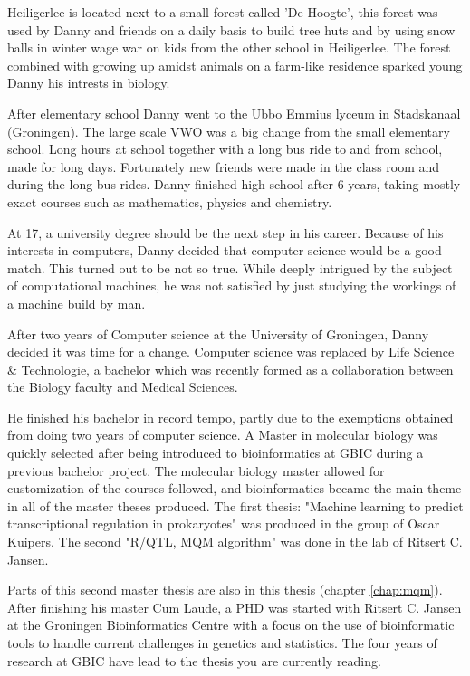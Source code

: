 Heiligerlee is located next to a small forest called 'De Hoogte', this forest was used 
by Danny and friends on a daily basis to build tree huts and by using snow balls in winter 
wage war on kids from the other school in Heiligerlee. The forest combined with growing up 
amidst animals on a farm-like residence sparked young Danny his intrests in biology.

After elementary school Danny went to the Ubbo Emmius lyceum in Stadskanaal (Groningen). 
The large scale VWO was a big change from the small elementary school. Long hours at school 
together with a long bus ride to and from school, made for long days. Fortunately new 
friends were made in the class room and during the long bus rides. Danny finished high 
school after 6 years, taking mostly exact courses such as mathematics, physics and chemistry.

At 17, a university degree should be the next step in his career. Because of his interests 
in computers, Danny decided that computer science would be a good match. This turned out 
to be not so true. While deeply intrigued by the subject of computational machines, he 
was not satisfied by just studying the workings of a machine build by man.

After two years of Computer science at the University of Groningen, Danny decided it was time 
for a change. Computer science was replaced by Life Science \& Technologie, a bachelor which 
was recently formed as a collaboration between the Biology faculty and Medical Sciences.

He finished his bachelor in record tempo, partly due to the exemptions obtained from 
doing two years of computer science. A Master in molecular biology was quickly selected after
being introduced to bioinformatics at GBIC during a previous bachelor project. The molecular 
biology master allowed for customization of the courses followed, and bioinformatics became the main 
theme in all of the master theses produced. The first thesis: "Machine learning to predict 
transcriptional regulation in prokaryotes" was produced in the group of Oscar Kuipers. 
The second "R/QTL, MQM algorithm" was done in the lab of Ritsert C. Jansen.

Parts of this second master thesis are also in this thesis (chapter \ref{chap:mqm}).
After finishing his master Cum Laude, a PHD was started with Ritsert C. Jansen at the 
Groningen Bioinformatics Centre with a focus on the use of bioinformatic tools to handle 
current challenges in genetics and statistics. The four years of research at GBIC have 
lead to the thesis you are currently reading.\\\\

